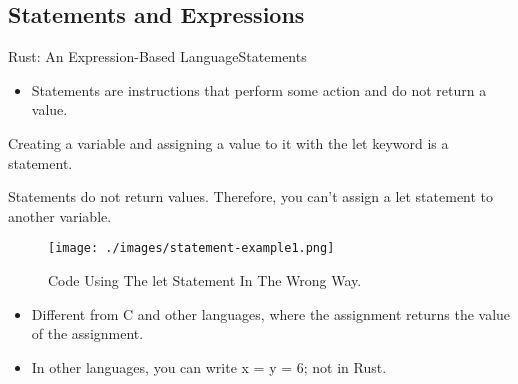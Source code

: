 \documentclass[10pt]{beamer}
\begin{document}
\subsection{Statements and Expressions}
\begin{frame}{Rust: An Expression-Based Language}{Statements}
    \begin{itemize}
        \item Statements are instructions that perform some action and do not return a value.
    \end{itemize}

    Creating a variable and assigning a value to it with the let keyword is a statement.

    Statements do not return values. Therefore, you can’t assign a let statement to another variable.
    \begin{figure}[htpb]
        \centering
        \texttt{[image: ./images/statement-example1.png]}
        \caption{Code Using The let Statement In The Wrong Way.\cite{rust-book}}
    \end{figure}

    \vspace*{-5mm}
    \begin{itemize}
        \item Different from C and other languages, where the assignment returns the value of the assignment.
        \item In other languages, you can write x = y = 6; not in Rust.
    \end{itemize}
\end{frame}
\end{document}
